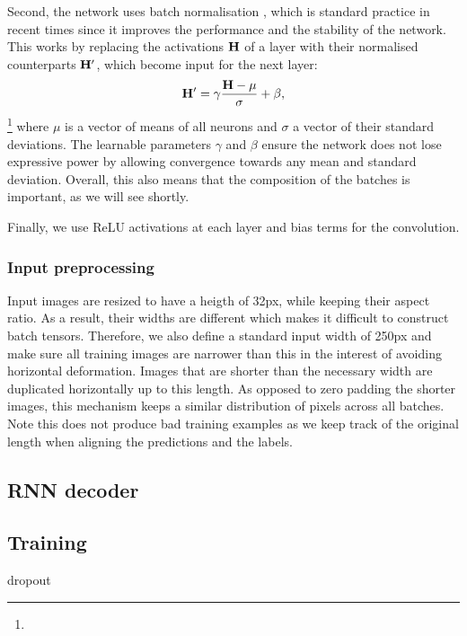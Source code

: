 		Second, the network uses batch normalisation \citep{batch_norm}, which is standard practice in recent times since it improves the performance and the stability of the network. This works by replacing the activations \(\mathbf{H}\) of a layer with their normalised counterparts \(\mathbf{H}'\), which become input for the next layer: \[
			\mathbf{H}' = \gamma \frac{\mathbf{H} - \mathbf{\mu}}{\mathbf{\sigma}} + \beta,
		\]\footnote{} where \(\mu\) is a vector of means of all neurons and \(\sigma\) a vector of their standard deviations. The learnable parameters \(\gamma\) and \(\beta\) ensure the network does not lose expressive power by allowing convergence towards any mean and standard deviation. Overall, this also means that the composition of the batches is important, as we will see shortly.

		Finally, we use ReLU activations at each layer and bias terms for the convolution.

		\subsubsection*{Input preprocessing}

			Input images are resized to have a heigth of 32px, while keeping their aspect ratio. As a result, their widths are different which makes it difficult to construct batch tensors. Therefore, we also define a standard input width of 250px and make sure all training images are narrower than this in the interest of avoiding horizontal deformation. Images that are shorter than the necessary width are duplicated horizontally up to this length. As opposed to zero padding the shorter images, this mechanism keeps a similar distribution of pixels across all batches. Note this does not produce bad training examples as we keep track of the original length when aligning the predictions and the labels.

\startToDo{}


	\subsection{RNN decoder}


	\subsection{Training}
		dropout


